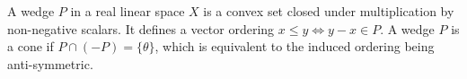 A wedge $P$ in a real linear space $X$ is a convex set closed under multiplication by non-negative scalars. It defines a vector ordering $x \leqslant y \iff y - x \in P$. A wedge $P$ is a cone if $P \cap (-P) = \{\theta\}$, which is equivalent to the induced ordering being anti-symmetric.